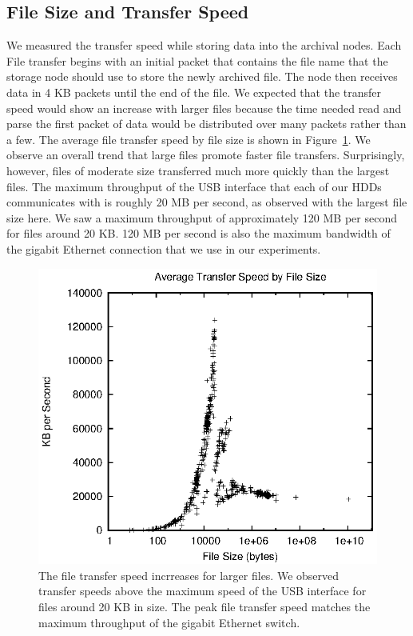 \subsection{File Size and Transfer Speed}
We measured the transfer speed while storing data into the archival nodes.  Each File transfer begins with an initial packet that contains the file name that the storage node should use to store the newly archived file.  The node then receives data in 4 KB packets until the end of the file.  We expected that the transfer speed would show an increase with larger files because the time needed read and parse the first packet of data would be distributed over many packets rather than a few.  The average file transfer speed by file size is shown in Figure~\ref{fig6}.  We observe an overall trend that large files promote faster file transfers.  Surprisingly, however, files of moderate size transferred much more quickly than the largest files.  The maximum throughput of the USB interface that each of our HDDs communicates with is roughly 20 MB per second, as observed with the largest file size here.  We saw a maximum throughput of approximately 120 MB per second for files around 20 KB.  120 MB per second is also the maximum bandwidth of the gigabit Ethernet connection that we use in our experiments.

\begin{figure}[!ht]
\includegraphics[width=\linewidth]{fig6.eps}
\caption{The file transfer speed incrreases for larger files.  We observed transfer speeds above the maximum speed of the USB interface for files around 20 KB in size.  The peak file transfer speed matches the maximum throughput of the gigabit Ethernet switch.}
\label{fig6}
\end{figure}

